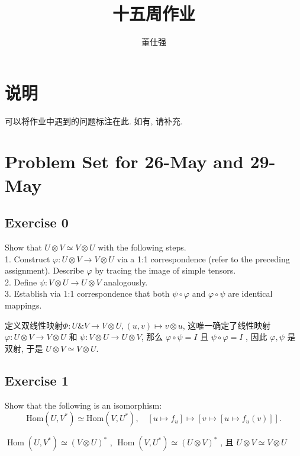 \documentclass[11pt]{ctexart}
\title{十五周作业}
\author{董仕强}
\theoremstyle{definition}
\numberwithin{equation}{section}
\newcommand{\op}[1]{\operatorname{#1}}%
\theoremstyle{definition}
\theoremstyle{remark}
\begin{document}
\maketitle

\section{说明}

可以将作业中遇到的问题标注在此. 如有, 请补充.

\tableofcontents

\newpage


\section{Problem Set for 26-May and 29-May}
\subsection{Exercise 0}
Show that $U \otimes V \simeq V \otimes U$ with the following steps.\\

1. Construct $\varphi : U \otimes V \to V \otimes U$ via a 1:1 correspondence (refer to the preceding assignment). Describe $\varphi$ by tracing the image of simple tensors.\\
2. Define $\psi : V \otimes U \to U \otimes V$ analogously.\\
3. Establish via 1:1 correspondence that both $\psi \circ \varphi$ and $\varphi \circ \psi$ are identical mappings.\\
\begin{aaa}
    定义双线性映射$\Phi : U\& V \to V\otimes U,  (u,v)\mapsto v\otimes u$, 这唯一确定了线性映射 $\varphi: U\otimes V \to V\otimes U$ 和 $\psi : V \otimes U \to U \otimes V$, 那么 $\varphi \circ \psi = I$ 且 $\psi \circ \varphi = I$ , 因此 $\varphi, \psi$ 是双射, 于是 $U\otimes V \simeq V\otimes U$.
\end{aaa}

\subsection{Exercise 1}
Show that the following is an isomorphism:
$$
\mathrm{Hom}(U, V^*) \simeq \mathrm{Hom}(V,U^\ast),\quad [u \mapsto f_u] \mapsto [v \mapsto [u \mapsto f_u(v)]].
$$
\begin{aaa}
    $\op{Hom}(U,V^*)\simeq (V\otimes U)^*$ , $\op{Hom}(V,U^*)\simeq (U\otimes V)^*$ , 且 $U\otimes V \simeq V\otimes U$
\end{aaa}
\end{document}
